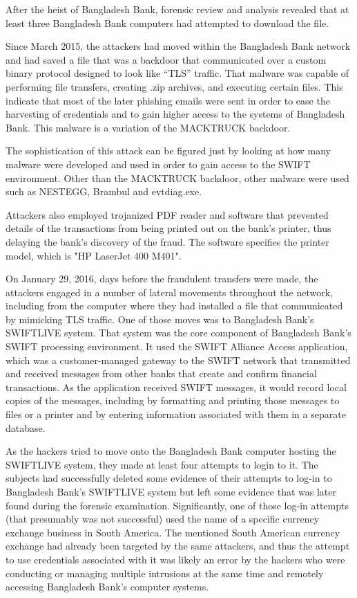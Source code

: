 \documentclass[12pt]{article}
\begin{document}
        After the heist of Bangladesh Bank, forensic review and analysis revealed that at least three Bangladesh Bank computers had attempted to download the file. 
        
        Since March 2015, the attackers had moved within the Bangladesh Bank network and had saved a file that was a backdoor that communicated over a custom binary protocol designed to look like “TLS” traffic. That malware was capable of performing file transfers, creating .zip archives, and executing certain files. This indicate that most of the later phishing emails were sent in order to ease the harvesting of credentials and to gain higher access to the systems of Bangladesh Bank. This malware is a variation of the MACKTRUCK backdoor. 
        
        The sophistication of this attack can be figured just by looking at how many malware were developed and used in order to gain access to the SWIFT environment. Other than the MACKTRUCK backdoor, other malware were used such as NESTEGG, Brambul and evtdiag.exe.
        
        Attackers also employed trojanized PDF reader and software that prevented details of the transactions from being printed out on the bank's printer, thus delaying the bank's discovery of the fraud. The software specifies the printer model, which is "HP LaserJet 400 M401". 
        
        On January 29, 2016, days before the fraudulent transfers were made, the attackers engaged in a number of lateral movements throughout the network, including from the computer where they had installed a file that communicated by mimicking TLS traffic. One of those moves was to Bangladesh Bank’s SWIFTLIVE system. That system was the core component of Bangladesh Bank’s SWIFT processing environment. It used the SWIFT Alliance Access application, which was a customer-managed gateway to the SWIFT network that transmitted and received messages from other banks that create and confirm financial transactions. As the application received SWIFT messages, it would record local copies of the messages, including by formatting and printing those messages to files or a printer and by entering information associated with them in a separate database.
        
        As the hackers tried to move onto the Bangladesh Bank computer hosting the SWIFTLIVE system, they made at least four attempts to login to it. The subjects had successfully deleted some evidence of their attempts to log-in to Bangladesh Bank’s SWIFTLIVE system but left some evidence that was later found during the forensic examination. Significantly, one of those log-in attempts (that presumably was not successful) used the name of a specific currency exchange business in South America. The mentioned South American currency exchange had already been targeted by the same attackers, and thus the attempt to use credentials associated with it was likely an error by the hackers who were conducting or managing multiple intrusions at the same time and remotely accessing Bangladesh Bank’s computer systems.
\end{document}
